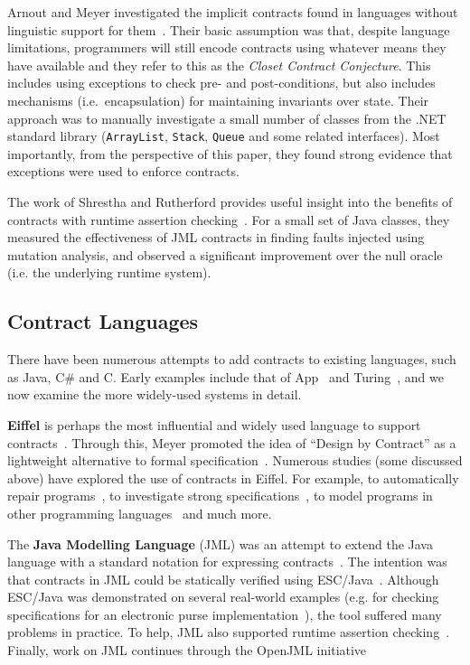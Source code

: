 \documentclass[a4paper,UKenglish]{lipics-v2016}
\begin{document}
Arnout and Meyer investigated the implicit contracts found in languages without linguistic support for them~\cite{AM02}.  Their basic assumption was that, despite language limitations, programmers will still encode contracts using whatever means they have available and they refer to this as the {\em Closet Contract Conjecture}.  This includes using exceptions to check pre- and post-conditions, but also includes mechanisms (i.e.\ encapsulation) for maintaining invariants over state.  Their approach was to manually investigate a small number of classes from the .NET standard library (\texttt{ArrayList}, \texttt{Stack}, \texttt{Queue} and some related interfaces).  Most importantly, from the perspective of this paper, they found strong evidence that exceptions were used to enforce contracts.

The work of Shrestha and Rutherford provides useful insight into the benefits of contracts with runtime assertion checking~\cite{SR11}.  For a small set of Java classes, they measured the effectiveness of JML contracts in finding faults injected using mutation analysis, and observed a significant improvement over the null oracle (i.e. the underlying runtime system).

\subsection{Contract Languages}

There have been numerous attempts to add contracts to existing languages, such as Java, C\# and C.  Early examples include that of App~\cite{Rosen95} and Turing~\cite{Holt88a}, and we now examine the more widely-used systems in detail.

{\bf Eiffel} is perhaps the most influential and widely used language to support contracts~\cite{Meyer88}.  Through this, Meyer promoted the idea of ``Design by Contract'' as a lightweight alternative to formal specification~\cite{meyer1992applying}.  Numerous studies (some discussed above) have explored the use of contracts in Eiffel.  For example, to automatically repair programs~\cite{PFNWMZ14}, to investigate strong specifications~\cite{PFP13}, to model programs in other programming languages~\cite{AM02} and much more.

The {\bf Java Modelling Language} (JML) was an attempt to extend the Java language with a standard notation for expressing contracts~\cite{CKLP05,CR08,LCCRC05}.  The intention was that contracts in JML could be statically verified using ESC/Java~\cite{FLLNSS02}.  Although ESC/Java was demonstrated on several real-world examples (e.g. for checking specifications for an electronic purse implementation~\cite{CH02}), the tool suffered many problems in practice.  To help, JML also supported runtime assertion checking~\cite{CL02,BCCEKLLP03,LCCRC05,CR08}.  Finally, work on JML continues through the OpenJML initiative~\cite{Cok14,SL14,Cok11}
\end{document}
